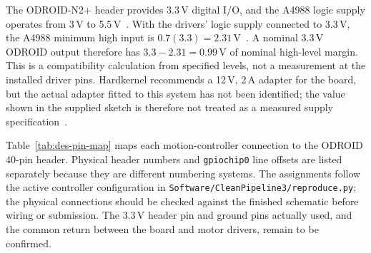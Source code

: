 The ODROID-N2+ header provides 3.3\,V digital I/O, and the A4988 logic supply operates from 3\,V to 5.5\,V~\cite[``GPIO (40Pin header)'' and ``External I/O'' sections, unpaginated]{odroidn2ds}\cite[PDF p.~5, ``Logic Supply Voltage Range'']{a4988ds}. With the drivers' logic supply connected to 3.3\,V, the A4988 minimum high input is $0.7(3.3)=2.31$\,V~\cite[PDF p.~4, Table~2]{a4988ds}. A nominal 3.3\,V ODROID output therefore has $3.3-2.31=0.99$\,V of nominal high-level margin. This is a compatibility calculation from specified levels, not a measurement at the installed driver pins. Hardkernel recommends a 12\,V, 2\,A adapter for the board, but the actual adapter fitted to this system has not been identified; the value shown in the supplied sketch is therefore not treated as a measured supply specification~\cite[``Power'' section, unpaginated]{odroidn2ds}.

Table~\ref{tab:des-pin-map} maps each motion-controller connection to the ODROID 40-pin header. Physical header numbers and \texttt{gpiochip0} line offsets are listed separately because they are different numbering systems. The assignments follow the active controller configuration in \texttt{Software/CleanPipeline3/reproduce.py}; the physical connections should be checked against the finished schematic before wiring or submission. The 3.3\,V header pin and ground pins actually used, and the common return between the board and motor drivers, remain to be confirmed.

